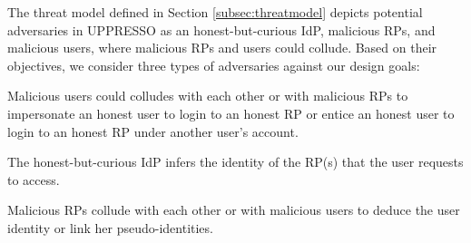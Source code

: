 
\newc
The threat model defined in Section \ref{subsec:threatmodel} depicts potential adversaries in UPPRESSO as an honest-but-curious IdP, malicious RPs, and malicious users, where malicious RPs and users could collude.
Based on their objectives, we consider three types of adversaries against our design goals:
\vspace{-\topsep}\begin{description}
\setlength{\topsep}{0pt}
\setlength{\partopsep}{0pt}
\setlength{\itemsep}{0pt}
\setlength{\parsep}{0pt}
\setlength{\parskip}{0pt}
\item[Security]
Malicious users could colludes with each other or with malicious RPs to impersonate an honest user to login to an honest RP or entice an honest user to login to an honest RP under another user's account.

\item[Privacy against the IdP]
The honest-but-curious IdP infers the identity of the RP(s) that the user requests to access.

\item[Privacy against RPs]
Malicious RPs collude with each other or with malicious users to deduce the user identity or link her pseudo-identities.

\end{description}


